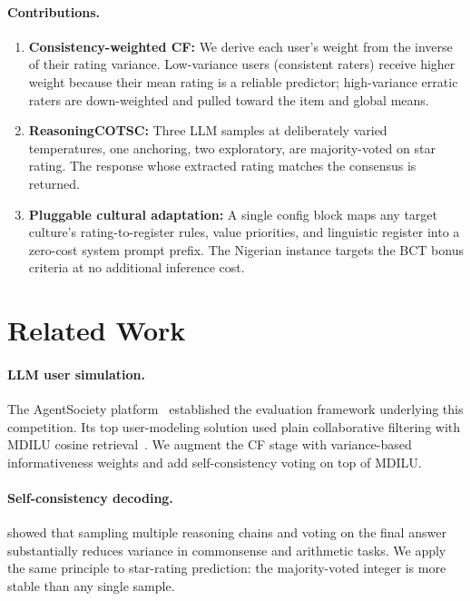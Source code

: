 \documentclass[11pt]{article}
\begin{document}
\paragraph{Contributions.}
\begin{enumerate}
  \item \textbf{Consistency-weighted CF:} We derive each user's weight
    from the inverse of their rating variance. Low-variance users (consistent
    raters) receive higher weight because their mean rating is a reliable
    predictor; high-variance erratic raters are down-weighted and pulled toward
    the item and global means.
  \item \textbf{ReasoningCOTSC:} Three LLM samples at deliberately varied
    temperatures, one anchoring, two exploratory, are majority-voted on star
    rating. The response whose extracted rating matches the consensus is returned.
  \item \textbf{Pluggable cultural adaptation:} A single config block maps any
    target culture's rating-to-register rules, value priorities, and linguistic
    register into a zero-cost system prompt prefix.
    The Nigerian instance targets the BCT bonus criteria at no additional
    inference cost.
\end{enumerate}

\section{Related Work}

\paragraph{LLM user simulation.}
The AgentSociety platform~\citep{piao2025agentsociety} established the
evaluation framework underlying this competition.
Its top user-modeling solution used plain collaborative filtering with MDILU
cosine retrieval~\citep{guo2025agentsocietychallenge}.
We augment the CF stage with variance-based informativeness weights and add
self-consistency voting on top of MDILU.

\paragraph{Self-consistency decoding.}
\citet{wang2023selfconsistency} showed that sampling multiple reasoning chains
and voting on the final answer substantially reduces variance in commonsense
and arithmetic tasks.
We apply the same principle to star-rating prediction: the majority-voted integer
is more stable than any single sample.
\end{document}

